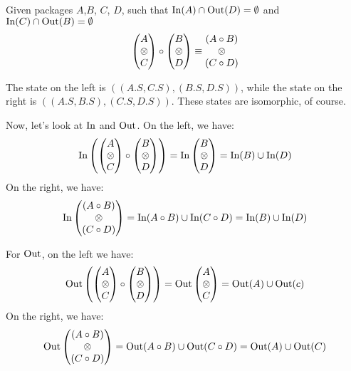\begin{lemma}
    \label{thm:package_interchange}
    Given packages $A$,$B$, $C$, $D$, such that
    $\text{In}(A) \cap \text{Out}(D) = \emptyset$ and $\text{In}(C) \cap \text{Out}(B) = \emptyset$
    $$
    \begin{pmatrix}
        A\cr
        \otimes\cr
        C\cr
    \end{pmatrix}
    \circ
    \begin{pmatrix}
        B\cr
        \otimes\cr
        D\cr
    \end{pmatrix}
    \equiv
    \begin{matrix}
        (A \circ B)\cr
        \otimes\cr
        (C \circ D)\cr
    \end{matrix}
    $$

     The state on the left is $((A.S, C.S), (B.S, D.S))$,
    while the state on the right is $((A.S, B.S), (C.S, D.S))$.
    These states are isomorphic, of course.

    Now, let's look at $\text{In}$ and $\text{Out}$.
    On the left, we have:
    $$
    \text{In}\left(
    \begin{pmatrix}
        A\cr
        \otimes\cr
        C\cr
    \end{pmatrix}
    \circ
    \begin{pmatrix}
        B\cr
        \otimes\cr
        D\cr
    \end{pmatrix}
    \right)
    =
    \text{In}
    \begin{pmatrix}
        B\cr
        \otimes\cr
        D\cr
    \end{pmatrix}
    = \text{In}(B) \cup \text{In}(D)
    $$
    On the right, we have:
    $$
    \text{In}
    \begin{pmatrix}
        (A \circ B)\cr
        \otimes\cr
        (C \circ D)\cr
    \end{pmatrix}
    =
    \text{In}(A \circ B) \cup \text{In}(C \circ D)
    = \text{In}(B) \cup \text{In}(D)
    $$

    For $\text{Out}$, on the left we have:
    $$
    \text{Out}\left(
    \begin{pmatrix}
        A\cr
        \otimes\cr
        C\cr
    \end{pmatrix}
    \circ
    \begin{pmatrix}
        B\cr
        \otimes\cr
        D\cr
    \end{pmatrix}
    \right)
    =
    \text{Out}
    \begin{pmatrix}
        A\cr
        \otimes\cr
        C\cr
    \end{pmatrix}
    = \text{Out}(A) \cup \text{Out}(c)
    $$
    On the right, we have:
    $$
    \text{Out}
    \begin{pmatrix}
        (A \circ B)\cr
        \otimes\cr
        (C \circ D)\cr
    \end{pmatrix}
    =
    \text{Out}(A \circ B) \cup \text{Out}(C \circ D)
    = \text{Out}(A) \cup \text{Out}(C)
    $$


\end{lemma}
